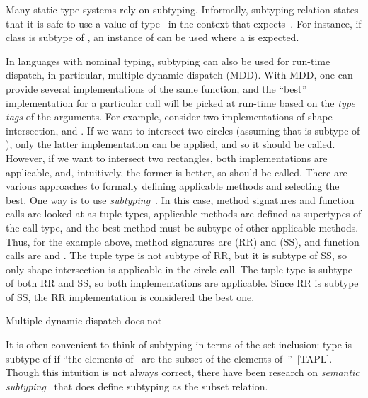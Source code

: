 Many static type systems rely on subtyping.
Informally, subtyping relation  states that it is safe
to use a value of type~ in the context that expects~.
For instance, if class  is subtype of ,
an instance of  can be used where a 
is expected.

In languages with nominal typing, subtyping can also be used for run-time
dispatch, in particular, multiple dynamic dispatch (MDD).
With MDD, one can provide several implementations of the same function,
and the ``best'' implementation for a particular call will be picked 
at run-time based on the \emph{type tags} of the arguments.
For example, consider two implementations of shape intersection,
 and .
If we want to intersect two circles (assuming that 
is subtype of ), only the latter implementation can be applied,
and so it should be called.
However, if we want to intersect two rectangles, both implementations 
are applicable, and, intuitively, the former is better, 
so  should be called.
There are various approaches to formally 
defining applicable methods and selecting the best. 
One way is to use \emph{subtyping}~\cite{?}.
In this case, method signatures and function calls are looked at 
as tuple types, applicable methods are defined as supertypes of the call type, 
and the best method must be subtype of other applicable methods. 
Thus, for the example above, method signatures are 
 (RR) 
and  (SS),
and function calls are
 and .
The  tuple type is not subtype of RR,
but it is subtype of SS, so only shape intersection
is applicable in the circle call.
The  tuple type is subtype of both RR and SS, 
so both implementations are applicable.
Since RR is subtype of SS, the RR implementation is considered the best one.

Multiple dynamic dispatch does not 


It is often convenient to think of subtyping in terms of the set inclusion:
type  is subtype of  if ``the elements of~
are the subset of the elements of~''~[TAPL].
Though this intuition is not always correct, there have been research on
\emph{semantic subtyping}~\cite{??} that does define subtyping as the subset
relation.






